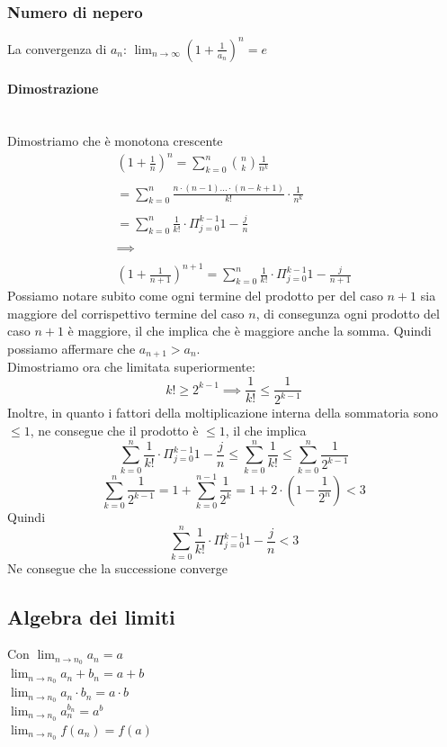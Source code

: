 \documentclass{report}
\newcommand{\subsubsubsection}[1]{\paragraph{#1}\mbox{}\\}
\begin{document}
    \subsubsection{Numero di nepero}
        La convergenza di $a_n$: $\lim_{n \to \infty} \left(1+\frac{1}{a_n}\right)^n = e$
        \subsubsubsection{Dimostrazione}
            Dimostriamo che è monotona crescente
            $$\begin{array}{c}
                \left(1 + \frac{1}{n}\right)^n = \sum_{k = 0}^n \binom{n}{k}\frac{1}{n^k} \\ \\
                = \sum_{k = 0}^n \frac{n \cdot \left(n-1\right) ... \cdot \left(n-k+1\right)}{k!} \cdot \frac{1}{n^k} \\ \\
                = \sum_{k = 0}^n \frac{1}{k!} \cdot \Pi_{j = 0}^{k-1} 1 - \frac{j}{n} \\ \\
                \implies \\  \\
                \left(1 + \frac{1}{n+1}\right)^{n+1} = \sum_{k = 0}^n\frac{1}{k!} \cdot \Pi_{j=0}^{k-1} 1 - \frac{j}{n+1}
            \end{array}$$
            Possiamo notare subito come ogni termine del prodotto per del caso $n+1$ sia maggiore del corrispettivo termine del caso $n$, di consegunza 
            ogni prodotto del caso $n+1$ è maggiore, il che implica che è maggiore anche la somma. Quindi possiamo affermare che $a_{n+1} > a_n$. \\
            Dimostriamo ora che limitata superiormente: \\
            $$k! \geq 2^{k-1} \implies \frac{1}{k!} \leq \frac{1}{2^{k-1}}$$
            Inoltre, in quanto i fattori della moltiplicazione interna della sommatoria sono $\leq 1$, ne consegue che il prodotto è $\leq 1$, il che implica
            $$\sum_{k=0}^n \frac{1}{k!} \cdot \Pi_{j = 0}^{k-1}  1 - \frac{j}{n} \leq \sum_{k=0}^n \frac{1}{k!} \leq \sum_{k=0}^n \frac{1}{2^{k-1}}$$
            $$\sum_{k=0}^n \frac{1}{2^{k-1}} = 1 + \sum_{k = 0}^{n-1}\frac{1}{2^k} = 1 + 2 \cdot \left(1 - \frac{1}{2^n}\right) < 3$$
            Quindi 
            $$\sum_{k=0}^n \frac{1}{k!} \cdot \Pi_{j = 0}^{k-1}  1 - \frac{j}{n} < 3$$
            Ne consegue che la successione converge
    \subsection{Algebra dei limiti}
        Con $\lim_{n \to n_0} a_n = a$ \\
        $\lim_{n \to n_0} a_n + b_n = a + b$ \\
        $\lim_{n \to n_0} a_n \cdot b_n = a \cdot b$ \\
        $\lim_{n \to n_0} a_n^{b_n} = a^b$ \\
        $\lim_{n \to n_0} f(a_n) = f(a)$ \\
\end{document}
